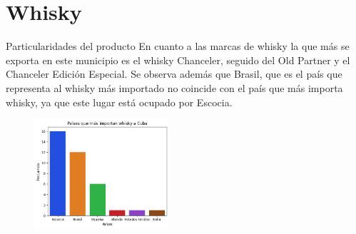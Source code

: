 \documentclass{beamer}
\begin{document}
\section{Whisky}
    \begin{frame}{Particularidades del producto}
      \small En cuanto a las marcas de whisky la que más se exporta en este municipio es el whisky Chanceler, seguido del Old Partner y el Chanceler Edición Especial. Se observa además que Brasil, que es el país que representa al whisky más importado no coincide con el país que más importa whisky, ya que este lugar está ocupado por Escocia. 
     \begin{figure}[h]
     	\centering
     	\includegraphics[width=5cm]{whisky export.png}
     \end{figure}

    \end{frame}
\end{document}
